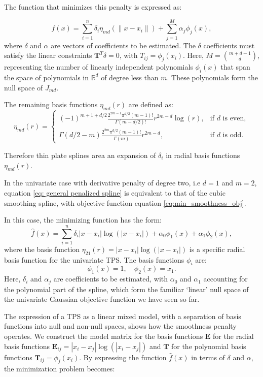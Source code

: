 \documentclass[
11pt, %
oneside, %
english, %
singlespacing, %
]{macthesis} %
\begin{document}
The function that minimizes this penalty is expressed as:

\[
\hat{f}(x) = \sum_{i=1}^n \delta_i \eta_{md}(\|x - x_i\|) + \sum_{j=1}^M \alpha_j \phi_j(x),
\]
where \(\delta\) and \(\alpha\) are vectors of coefficients to be estimated. The \(\delta\) coefficients must satisfy the linear constraints \(\mathbf{T}^T \delta = 0\), with \(T_{ij} = \phi_j(x_i)\). Here, \(M = \binom{m+d-1}{d}\), representing the number of linearly independent polynomials \(\phi_i(x)\) that span the space of polynomials in \(\mathbb{R}^d\) of degree less than \(m\). These polynomials form the null space of \(J_{md}\).

The remaining basis functions \(\eta_{md}(r)\) are defined as:
\[
\eta_{md}(r) = 
\begin{cases} 
(-1)^{m+1+d/2} \frac{2^{2m-1} \pi^{d/2} (m-1)!}{\Gamma(m-d/2)!} r^{2m-d} \log(r), & \text{if } d \text{ is even}, \\
\Gamma(d/2 - m) \frac{2^{2m} \pi^{d/2} (m-1)!}{\Gamma(m)} r^{2m-d}, & \text{if } d \text{ is odd}.
\end{cases}
\]

Therefore thin plate splines area an expansion of \(\delta_i\) in radial basis functions \(\eta_{md} (r)\).

In the univariate case with derivative penalty of degree two, i.e \(d =  1\) and \(m = 2\), equation \ref{eq: general penalized spline} is equivalent to that of the cubic smoothing spline, with objective function equation \ref{eq:min_smoothness_obj}.

In this case, the minimizing function has the form:
\[
\hat{f}(x) = \sum_{i=1}^n \delta_i |x - x_i| \log(|x - x_i|) + \alpha_0\phi_1(x) + \alpha_1 \phi_2(x),
\]
where the basis function \(\eta_{21}(r) =|x - x_i| \log(|x - x_i|)\) is a specific radial basis function for the univariate TPS. The basis functions \(\phi_i\) are:
\[
\phi_1(x) = 1, \quad \phi_2(x) = x_1.
\]
Here, \(\delta_i\) and \(\alpha_j\) are coefficients to be estimated, with \(\alpha_0\) and \(\alpha_1\) accounting for the polynomial part of the spline, which form the familiar `linear' null space of the univariate Gaussian objective function we have seen so far.

The expression of a TPS as a linear mixed model, with a separation of basis functions into null and non-null spaces, shows how the smoothness penalty operates. We construct the model matrix for the basis functions \(\mathbf{E}\) for the radial basis functions \(\mathbf{E}_{ij} = |x_i - x_j| \log(|x_i - x_j|)\) and \(\mathbf{T}\) for the polynomial basis functions \(\mathbf{T}_{ij} = \phi_j(x_i)\). By expressing the function \(\hat{f}(x)\) in terms of \(\delta\) and \(\alpha\), the minimization problem becomes:
\end{document}

